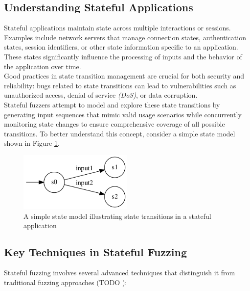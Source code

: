 \subsection{Understanding Stateful Applications}
Stateful applications maintain state across multiple interactions or sessions. Examples include network servers that manage connection states, authentication states, session identifiers, or other state information specific to an application. These states significantly influence the processing of inputs and the behavior of the application over time.
\\Good practices in state transition management are crucial for both security and reliability: bugs related to state transitions can lead to vulnerabilities such as unauthorized access, denial of service \textit{(DoS)}, or data corruption. 
\\Stateful fuzzers attempt to model and explore these state transitions by generating input sequences that mimic valid usage scenarios while concurrently monitoring state changes to ensure comprehensive coverage of all possible transitions. To better understand this concept, consider a simple state model shown in Figure \ref{fig:simplestatemodel}.
\begin{figure}[h]
    \centering
    \includegraphics[width=0.5\textwidth]{Images/simplestatemodel.png}
    \caption{A simple state model illustrating state transitions in a stateful application}
    \label{fig:simplestatemodel}
\end{figure}


\subsection{Key Techniques in Stateful Fuzzing}
Stateful fuzzing involves several advanced techniques that distinguish it from traditional fuzzing approaches (TODO \cite{}):

